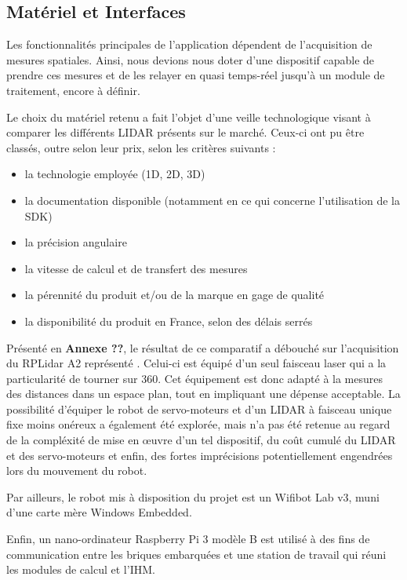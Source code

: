   \subsection{Matériel et Interfaces}
  \label{subsec:archi-physique}
  
Les fonctionnalités principales de l'application dépendent de l'acquisition de mesures spatiales. 
Ainsi, nous devions nous doter d'une dispositif capable de prendre ces mesures et de les relayer en quasi temps-réel jusqu'à un module de traitement, encore à définir. 

Le choix du matériel retenu a fait l'objet d'une veille technologique visant à comparer les différents \gls{LIDAR} présents sur le marché. 
Ceux-ci ont pu être classés, outre selon leur prix, selon les critères suivants : 

\begin{itemize}
  \item la technologie employée (1D, 2D, 3D)
  \item la documentation disponible (notamment en ce qui concerne l'utilisation de la \gls{SDK})
  \item la précision angulaire
  \item la vitesse de calcul et de transfert des mesures
  \item la pérennité du produit et/ou de la marque en gage de qualité
  \item la disponibilité du produit en France, selon des délais serrés
\end{itemize}

Présenté en \textbf{Annexe ??}, le résultat de ce comparatif a débouché sur l'acquisition du RPLidar A2 représenté \textbf{}.
Celui-ci est équipé d'un seul faisceau laser qui a la particularité de tourner sur 360\degre. 
Cet équipement est donc adapté à la mesures des distances dans un espace plan, tout en impliquant une dépense acceptable. 
La possibilité d'équiper le robot de servo-moteurs et d'un LIDAR à faisceau unique fixe moins onéreux a également été explorée, mais n'a pas été retenue au regard de la compléxité de mise en \oe{}uvre d'un tel dispositif, 
du coût cumulé du LIDAR et des servo-moteurs et enfin, des fortes imprécisions potentiellement engendrées lors du mouvement du robot. 

Par ailleurs, le robot mis à disposition du projet est un Wifibot Lab v3, muni d'une carte mère Windows Embedded. 

Enfin, un nano-ordinateur Raspberry Pi 3 modèle B est utilisé à des fins de communication entre les briques embarquées et une station de travail qui réuni les modules de calcul et l'\gls{IHM}.

